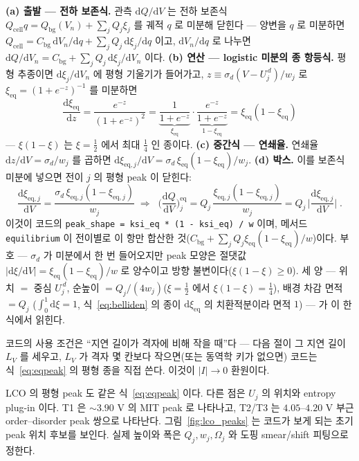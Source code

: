 \documentclass[11pt,a4paper]{article}
\newcommand{\dd}{\mathrm{d}}
\newcommand{\eq}{\mathrm{eq}}
\newcommand{\cell}{\mathrm{cell}}
\newcommand{\bg}{\mathrm{bg}}
\newcommand{\code}[1]{\texttt{#1}}
\begin{document}
\textbf{(a) 출발 — 전하 보존식.} 관측 $\dd Q/\dd V$ 는 전하 보존식 $Q_\cell q=Q_\bg(V_n)+\sum_jQ_j\xi_j$ 를 궤적
$q$ 로 미분해 닫힌다 — 양변을 $q$ 로 미분하면 $Q_\cell=C_\bg\,\dd V_n/\dd q+\sum_jQ_j\,\dd\xi_j/\dd q$ 이고,
$\dd V_n/\dd q$ 로 나누면 $\dd Q/\dd V_n=C_\bg+\sum_jQ_j\,\dd\xi_j/\dd V_n$ 이다. \textbf{(b) 연산 — logistic
미분의 종 항등식.} 평형 추종이면 $\dd\xi_j/\dd V_n$ 에 평형 기울기가 들어가고, $z\equiv\sigma_d(V-U_j^{\,d})/w_j$ 로
$\xi_\eq=(1+e^{-z})^{-1}$ 를 미분하면
\begin{equation}
\frac{\dd\xi_\eq}{\dd z}=\frac{e^{-z}}{(1+e^{-z})^2}
=\underbrace{\frac{1}{1+e^{-z}}}_{\xi_\eq}\cdot\underbrace{\frac{e^{-z}}{1+e^{-z}}}_{1-\xi_\eq}
=\xi_\eq(1-\xi_\eq)
\label{eq:belliden}
\end{equation}
— $\xi(1-\xi)$ 는 $\xi=\tfrac12$ 에서 최대 $\tfrac14$ 인 종이다. \textbf{(c) 중간식 — 연쇄율.} 연쇄율
$\dd z/\dd V=\sigma_d/w_j$ 를 곱하면 $\dd\xi_{\eq,j}/\dd V=\sigma_d\,\xi_\eq(1-\xi_\eq)/w_j$. \textbf{(d) 박스.}
이를 보존식 미분에 넣으면 전이 $j$ 의 평형 peak 이 닫힌다:
\begin{equation}
\frac{\dd\xi_{\eq,j}}{\dd V}=\frac{\sigma_d\,\xi_{\eq,j}(1-\xi_{\eq,j})}{w_j}
\;\Longrightarrow\;
\boxed{\;\Big(\frac{\dd Q}{\dd V}\Big)^\eq_j
=Q_j\,\frac{\xi_{\eq,j}(1-\xi_{\eq,j})}{w_j}
=Q_j\,\Big|\frac{\dd\xi_{\eq,j}}{\dd V}\Big|\;.}
\label{eq:eqpeak}
\end{equation}
이것이 코드의 \code{peak\_shape = ksi\_eq * (1 - ksi\_eq) / w} 이며, 메서드 \code{equilibrium} 이 전이별로 이 항만
합산한 것($C_\bg+\sum_jQ_j\xi_\eq(1-\xi_\eq)/w$)이다. 부호 — $\sigma_d$ 가 미분에서 한 번 들어오지만 peak 모양은
절댓값 $|\dd\xi/\dd V|=\xi_\eq(1-\xi_\eq)/w$ 로 양수이고 방향 불변이다($\xi(1-\xi)\ge0$). 세 양 — 위치 $=$ 중심
$U_j^{\,d}$, 순높이 $=Q_j/(4w_j)$($\xi=\tfrac12$ 에서 $\xi(1-\xi)=\tfrac14$), 배경 차감 면적 $=Q_j$
($\int_0^1\dd\xi=1$, 식~\eqref{eq:belliden} 의 종이 $\dd\xi_\eq$ 의 치환적분이라 면적 $1$) — 가 이 한 식에서 읽힌다.

코드의 사용 조건은 ``지연 길이가 격자에 비해 작을 때''다 — 다음 절이 그 지연 길이 $L_V$ 를 세우고, $L_V$ 가 격자
몇 칸보다 작으면(또는 동역학 키가 없으면) 코드는 식~\eqref{eq:eqpeak} 의 평형 종을 직접 쓴다. 이것이 $|I|\to0$ 환원이다.

LCO 의 평형 peak 도 같은 식~\eqref{eq:eqpeak} 이다. 다른 점은 $U_j$ 의 위치와 entropy plug-in 이다. T1 은
$\sim3.90$ V 의 MIT peak 로 나타나고, T2/T3 는 $4.05$--$4.20$ V 부근 order--disorder peak 쌍으로 나타난다.
그림~\ref{fig:lco_peaks} 는 코드가 보게 되는 초기 peak 위치 후보를 보인다. 실제 높이와 폭은 $Q_j,w_j,\Omega_j$ 와
도핑 smear/shift 피팅으로 정한다.
\end{document}
